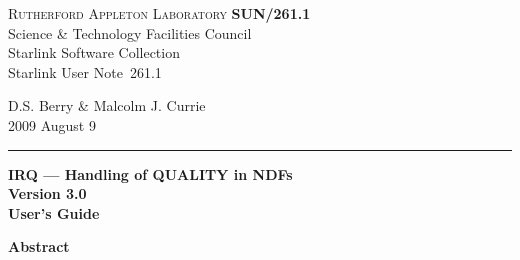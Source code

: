 \documentclass[twoside,11pt]{article}
\newcommand{\stardoccategory}  {Starlink User Note}
\newcommand{\stardocinitials}  {SUN}
\newcommand{\stardocnumber}    {261.1}
\newcommand{\stardocauthors}   {D.S. Berry \& Malcolm J. Currie}
\newcommand{\stardocdate}      {2009 August 9}
\newcommand{\stardoctitle}     {IRQ --- Handling of QUALITY in NDFs}
\newcommand{\stardocversion}   {Version 3.0}
\newcommand{\stardocmanual}    {User's Guide}
\newcommand{\stardocname}{\stardocinitials /\stardocnumber}
\newenvironment{latexonly}{}{}
\renewcommand{\_}{\texttt{\symbol{95}}}
\begin{document}
\thispagestyle{empty}

\begin{latexonly}
   \textsc{Rutherford Appleton Laboratory} \hfill \textbf{\stardocname}\\
   {\large Science \& Technology Facilities Council}\\
   {\large Starlink Software Collection\\}
   {\large \stardoccategory\ \stardocnumber}
   \begin{flushright}
   \stardocauthors\\
   \stardocdate
   \end{flushright}
   \vspace{-4mm}
   \rule{\textwidth}{0.5mm}
   \vspace{5mm}
   \begin{center}
   {\Huge\textbf{\stardoctitle \\ [2.5ex]}}
   {\LARGE\textbf{\stardocversion \\ [4ex]}}
   {\Huge\textbf{\stardocmanual}}
   \end{center}
   \vspace{5mm}


   \vspace{10mm}
   \begin{center}
      {\Large\textbf{Abstract}}
   \end{center}
\end{latexonly}
\end{document}
